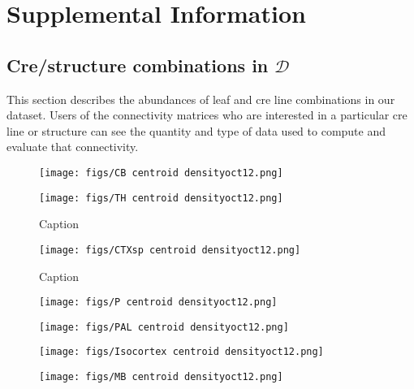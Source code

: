 \section{Supplemental Information}

\subsection{Cre/structure combinations in $\mathcal D$}
\label{supp_sec:data}

This section describes the abundances of leaf and cre line combinations in our dataset.
Users of the connectivity matrices who are interested in a particular cre line or structure can see the quantity and type of data used to compute and evaluate that connectivity.

\newpage

\begin{figure}[H]
    \centering
    \texttt{[image: figs/CB centroid densityoct12.png]}
    \label{fig:my_label}
\end{figure}
\newpage

\begin{figure}[H]
    \centering
    \texttt{[image: figs/TH centroid densityoct12.png]}
    \caption{Caption}
    \label{fig:my_label}
\end{figure}
\newpage

\begin{figure}[H]
    \centering
    \texttt{[image: figs/CTXsp centroid densityoct12.png]}
    \caption{Caption}
    \label{fig:my_label}
\end{figure}
\newpage

\begin{figure}[H]
    \centering
    \texttt{[image: figs/P centroid densityoct12.png]}
    \label{fig:my_label}
\end{figure}
\newpage

\begin{figure}[H]
    \centering
    \texttt{[image: figs/PAL centroid densityoct12.png]} 
    \label{fig:my_label}
\end{figure}
\newpage

\begin{figure}[H]
    \centering
    \texttt{[image: figs/Isocortex centroid densityoct12.png]}
    \label{fig:my_label}
\end{figure}
\newpage

\begin{figure}[H]
    \centering
    \texttt{[image: figs/MB centroid densityoct12.png]} 
    \label{fig:my_label}
\end{figure}
\newpage

